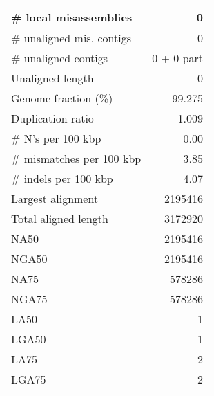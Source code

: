 \documentclass[12pt,a4paper]{article}
\begin{document}
\begin{table}[ht]
\begin{center}
\begin{tabular}{|l*{1}{|r}|}
\# local misassemblies & 0 \\ \hline
\# unaligned mis. contigs & 0 \\ \hline
\# unaligned contigs & 0 + 0 part \\ \hline
Unaligned length & 0 \\ \hline
Genome fraction (\%) & 99.275 \\ \hline
Duplication ratio & 1.009 \\ \hline
\# N's per 100 kbp & 0.00 \\ \hline
\# mismatches per 100 kbp & 3.85 \\ \hline
\# indels per 100 kbp & 4.07 \\ \hline
Largest alignment & 2195416 \\ \hline
Total aligned length & 3172920 \\ \hline
NA50 & 2195416 \\ \hline
NGA50 & 2195416 \\ \hline
NA75 & 578286 \\ \hline
NGA75 & 578286 \\ \hline
LA50 & 1 \\ \hline
LGA50 & 1 \\ \hline
LA75 & 2 \\ \hline
LGA75 & 2 \\ \hline
\end{tabular}
\end{center}
\end{table}
\end{document}
